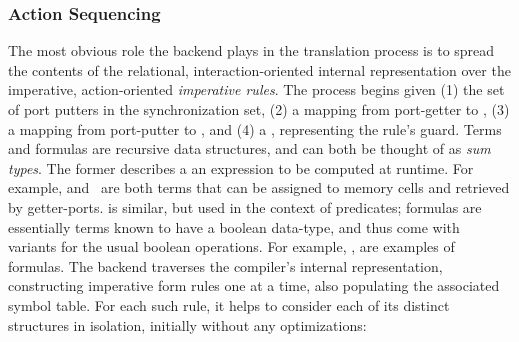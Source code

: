\subsubsection{Action Sequencing}
The most obvious role the backend plays in the translation process is to spread the contents of the relational, interaction-oriented internal representation over the imperative, action-oriented \textit{imperative rules}. The process begins given (1) the set of port putters in the synchronization set, (2) a mapping from port-getter to , (3) a mapping from port-putter to , and (4) a , representing the rule's guard. Terms and formulas are recursive data structures, and can both be thought of as \textit{sum types}. The former describes a an expression to be computed at runtime. For example,  and~ are both terms that can be assigned to memory cells and retrieved by getter-ports.  is similar, but used in the context of predicates; formulas are essentially terms known to have a boolean data-type, and thus come with variants for the usual boolean operations. For example, ,  are examples of formulas. The backend traverses the compiler's internal representation, constructing imperative form rules one at a time, also populating the associated  symbol table. For each such rule, it helps to consider each of its distinct structures in isolation, initially without any optimizations:

